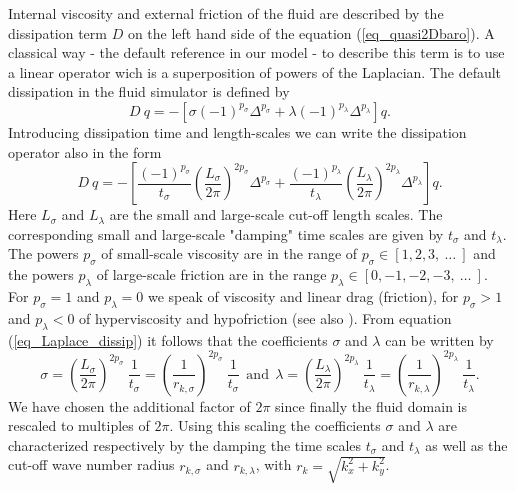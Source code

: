Internal viscosity and external friction of the fluid are described by 
the dissipation term $D$ on the left hand side of the equation 
(\ref{eq_quasi2Dbaro}). A classical way - the default reference in our
 model - to describe this term is to use a linear operator wich is a
superposition of powers of the Laplacian. 
The default dissipation in the fluid simulator is defined by
\begin{equation} \label{eq_Laplace_dissip}
  D \ q = - \left[\sigma \left(-1 \right)^{p_{\sigma}} \Delta^{p_{\sigma}}
                     +
                  \lambda \left(-1 \right)^{p_{\lambda}} \Delta^{p_{\lambda}}
            \right] q.
\end{equation}
Introducing dissipation time and length-scales we can write the 
dissipation operator also in the form 
\begin{equation} \label{eq_Laplace_dissip_02}
  D \ q = - \left[ 
              \frac{\left(-1 \right)^{p_{\sigma}}}{t_{\sigma}} 
              \left( 
               \frac{L_{\sigma}}{2 \pi}
              \right)^{2 p_{\sigma}}
              \Delta^{p_{\sigma}}
               +
              \frac{\left(-1 \right)^{p_{\lambda}}}{t_{\lambda}} 
              \left( 
                \frac{L_{\lambda}}{2 \pi}
              \right)^{2 p_{\lambda}}
              \Delta^{p_{\lambda}}
            \right] q.
\end{equation}
Here $L_{\sigma}$ and $L_{\lambda}$ are the small and 
large-scale cut-off length scales. The corresponding small and 
large-scale "damping" time scales are given by $t_{\sigma}$ 
and $t_{\lambda}$. The powers $p_{\sigma}$ of small-scale 
viscosity are in the range of $p_{\sigma} \in [1,2,3, \ \dots \ ]$ 
and the powers $p_{\lambda}$ of large-scale friction are in the 
range $p_{\lambda} \in [0,-1,-2,-3, \ \dots \ ]$. 
For $p_{\sigma} = 1$ and $p_{\lambda} = 0$ we speak of viscosity
and linear drag (friction), for $p_{\sigma} > 1$ and $p_{\lambda} < 0$
of hyperviscosity and hypofriction (see also \cite{danilovandgurarie2001}).
From equation (\ref{eq_Laplace_dissip}) it follows that the coefficients
$\sigma$ and $\lambda$ can be written by
\begin{equation} \label{eq_siglam}
  \sigma  = \left(\frac{L_{\sigma}}{2 \pi} \right)^{2 p_{\sigma}}
            \ \frac{1}{t_{\sigma}} 
          = \left(\frac{1}{r_{k,\sigma}}\right)^{2 p_{\sigma}}
            \ \frac{1}{t_{\sigma}} 
  \ \ \mbox{and} \ \
  \lambda = \left(\frac{L_{\lambda}}{2 \pi} \right)^{2 p_{\lambda}}
            \ \frac{1}{t_{\lambda}}
          = \left(\frac{1}{r_{k,\lambda}} \right)^{2 p_{\lambda}}
            \ \frac{1}{t_{\lambda}}.
\end{equation}
We have chosen the additional factor of $2 \pi$ since finally the
fluid domain is rescaled to multiples of $2 \pi$. Using this scaling
the coefficients $\sigma$ and $\lambda$ are characterized respectively 
by the damping the time scales $t_{\sigma}$ and $t_{\lambda}$ as well
as the cut-off wave number radius $r_{k,\sigma}$ and $r_{k,\lambda}$,
with $r_{k} = \sqrt{k^{2}_{x} + k^{2}_{y}}$.


